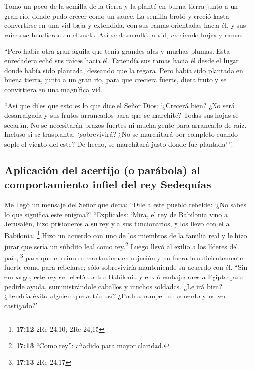  Tomó un poco de la semilla de la tierra y la plantó en
buena tierra junto a un gran río, donde pudo crecer como un sauce.
 La semilla brotó y creció hasta convertirse en una vid
baja y extendida, con sus ramas orientadas hacia él, y sus raíces se
hundieron en el suelo. Así se desarrolló la vid, creciendo hojas y
ramas.

 ``Pero había otra gran águila que tenía grandes alas y
muchas plumas. Esta enredadera echó sus raíces hacia él. Extendía sus
ramas hacia él desde el lugar donde había sido plantada, deseando que la
regara.  Pero había sido plantada en buena tierra, junto a
un gran río, para que creciera fuerte, diera fruto y se convirtiera en
una magnífica vid.

 ``Así que diles que esto es lo que dice el Señor Dios:
`¿Crecerá bien? ¿No será desarraigada y sus frutos arrancados para que
se marchite? Todas sus hojas se secarán. No se necesitarán brazos
fuertes ni mucha gente para arrancarlo de raíz.  Incluso
si se trasplanta, ¿sobrevivirá? ¿No se marchitará por completo cuando
sople el viento del este? De hecho, se marchitará justo donde fue
plantada'\,''.

\hypertarget{aplicaciuxf3n-del-acertijo-o-paruxe1bola-al-comportamiento-infiel-del-rey-sedequuxedas}{%
\subsection{Aplicación del acertijo (o parábola) al comportamiento
infiel del rey
Sedequías}\label{aplicaciuxf3n-del-acertijo-o-paruxe1bola-al-comportamiento-infiel-del-rey-sedequuxedas}}

 Me llegó un mensaje del Señor que decía: 
``Dile a este pueblo rebelde: `¿No sabes lo que significa este enigma?'
``Explícales: `Mira, el rey de Babilonia vino a Jerusalén, hizo
prisioneros a su rey y a sus funcionarios, y los llevó con él a
Babilonia. \footnote{\textbf{17:12} 2Re 24,10; 2Re 24,15}
 Hizo un acuerdo con uno de los miembros de la familia
real y le hizo jurar que sería un súbdito leal como rey.\footnote{\textbf{17:13}
  ``Como rey'': añadido para mayor claridad.} Luego llevó al exilio a
los líderes del país, \footnote{\textbf{17:13} 2Re 24,17}
 para que el reino se mantuviera en sujeción y no fuera
lo suficientemente fuerte como para rebelarse; sólo sobreviviría
manteniendo su acuerdo con él.  ``Sin embargo, este rey
se rebeló contra Babilonia y envió embajadores a Egipto para pedirle
ayuda, suministrándole caballos y muchos soldados. ¿Le irá bien?
¿Tendría éxito alguien que actúa así? ¿Podría romper un acuerdo y no ser
castigado?'

